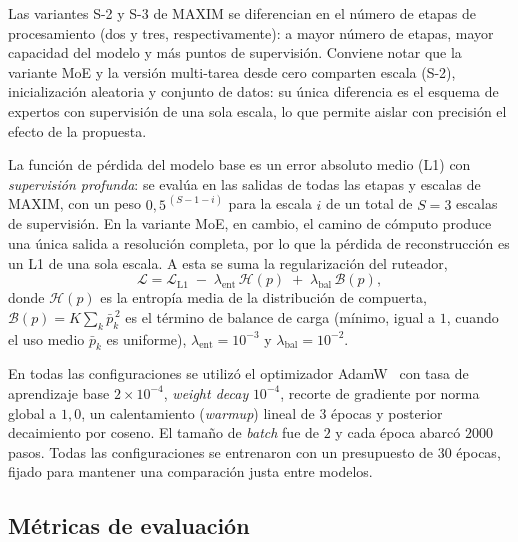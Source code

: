 \documentclass[aps,prl,twocolumn,groupedaddress]{revtex4-2}
\begin{document}
Las variantes S-2 y S-3 de MAXIM se diferencian en el número de etapas de procesamiento (dos y tres, respectivamente): a mayor número de etapas, mayor capacidad del modelo y más puntos de supervisión. Conviene notar que la variante MoE y la versión multi-tarea desde cero comparten escala (S-2), inicialización aleatoria y conjunto de datos: su única diferencia es el esquema de expertos con supervisión de una sola escala, lo que permite aislar con precisión el efecto de la propuesta.

La función de pérdida del modelo base es un error absoluto medio (L1) con \emph{supervisión profunda}: se evalúa en las salidas de todas las etapas y escalas de MAXIM, con un peso $0{,}5^{\,(S-1-i)}$ para la escala $i$ de un total de $S=3$ escalas de supervisión. En la variante MoE, en cambio, el camino de cómputo produce una única salida a resolución completa, por lo que la pérdida de reconstrucción es un L1 de una sola escala. A esta se suma la regularización del ruteador,
\begin{equation}
\mathcal{L} = \mathcal{L}_{\text{L1}}
  \;-\; \lambda_{\mathrm{ent}}\, \mathcal{H}(p)
  \;+\; \lambda_{\mathrm{bal}}\, \mathcal{B}(p),
\end{equation}
donde $\mathcal{H}(p)$ es la entropía media de la distribución de compuerta, $\mathcal{B}(p)=K\sum_k \bar{p}_k^{\,2}$ es el término de balance de carga (mínimo, igual a $1$, cuando el uso medio $\bar{p}_k$ es uniforme), $\lambda_{\mathrm{ent}}=10^{-3}$ y $\lambda_{\mathrm{bal}}=10^{-2}$.

En todas las configuraciones se utilizó el optimizador AdamW~\cite{loshchilov2019adamw} con tasa de aprendizaje base $2\times 10^{-4}$, \textit{weight decay} $10^{-4}$, recorte de gradiente por norma global a $1{,}0$, un calentamiento (\textit{warmup}) lineal de $3$ épocas y posterior decaimiento por coseno. El tamaño de \textit{batch} fue de $2$ y cada época abarcó $2000$ pasos. Todas las configuraciones se entrenaron con un presupuesto de $30$ épocas, fijado para mantener una comparación justa entre modelos.

\subsection{Métricas de evaluación}
\end{document}
